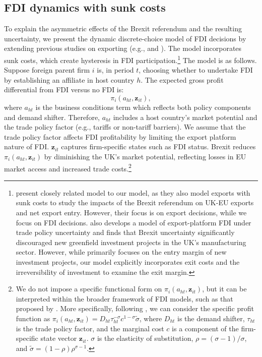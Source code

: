 \documentclass[preprint,11pt,authoryear]{elsarticle}
\begin{document}
\subsection{FDI dynamics with sunk costs}

To explain the asymmetric effects of the Brexit referendum and the resulting uncertainty, we present the dynamic discrete-choice model of FDI decisions by extending previous studies on exporting (e.g., \citealt{graziano2021brexit} and \citealt{roberts1997decision}). The model incorporates sunk costs, which create hysteresis in FDI participation.\footnote{\cite{graziano2021brexit} present closely related model to our model, as they also model exports with sunk costs to study the impacts of the Brexit referendum on UK-EU exports and net export entry. However, their focus is on export decisions, while we focus on FDI decisions. \cite{tamberi2024export} also develops a model of export-platform FDI under trade policy uncertainty and finds that Brexit uncertainty significantly discouraged new greenfield investment projects in the UK's manufacturing sector. However, while \cite{tamberi2024export} primarily focuses on the entry margin of new investment projects, our model explicitly incorporates exit costs and the irreversibility of investment to examine the exit margin.} 
The model is as follows. Suppose foreign parent firm $i$ is, in period $t$, choosing whether to undertake FDI by establishing an affiliate in host country $h$. The expected gross profit differential from FDI versus no FDI is:
$$
\pi_i(a_{ht}, \mathbf{z}_{it}),
$$
where $a_{ht}$ is the business conditions term which reflects both policy components and demand shifter. 
Therefore, $a_{ht}$ includes a host country's market potential and the trade policy factor (e.g., tariffs or non-tariff barriers).
We assume that the trade policy factor affects FDI profitability by limiting the export platform nature of FDI.
$\mathbf{z}_{it}$ captures firm-specific states such as FDI status. Brexit reduces $\pi_i(a_{ht}, \mathbf{z}_{it})$ by diminishing the UK's market potential, reflecting losses in EU market access and increased trade costs.\footnote{We do not impose a specific functional form on $\pi_i(a_{ht}, \mathbf{z}_{it})$, but it can be interpreted within the broader framework of FDI models, such as that proposed by \cite{head2021united}. More specifically, following \cite{graziano2021brexit}, we can consider the specific profit function as $\pi_{i}\left(a_{h t}, \mathbf{z}_{i t}\right)=D_{h t} \tau_{h t}^{-\sigma} c^{1-\sigma} \tilde{\sigma}$, where $D_{h t}$ is the demand shifter, $\tau_{h t}$ is the trade
policy factor, and the marginal cost $c$ is a component of the firm-specific state vector $\mathbf{z}_{i t}$. $\sigma$ is the elasticity of substitution, $\rho=(\sigma-1)/\sigma$, and $\tilde{\sigma}=(1-\rho)\rho^{\sigma-1}$.}
\end{document}
